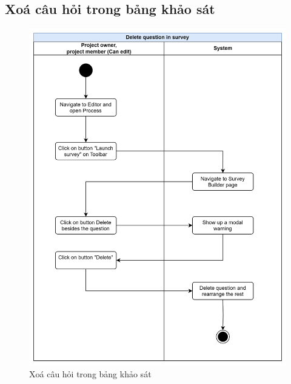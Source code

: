 \subsection{Xoá câu hỏi trong bảng khảo sát}
\begin{figure}[H]
    \centering
    \includegraphics[width=0.8\linewidth]{Content/Phân tích và thiết kế hệ thống/documents/Sơ đồ hoạt động/images/deleteQuestionInSurvey.png}
    \vspace{0.5cm}
    \caption{Xoá câu hỏi trong bảng khảo sát}
    \label{fig:Xoá câu hỏi trong bảng khảo sát}
\end{figure}